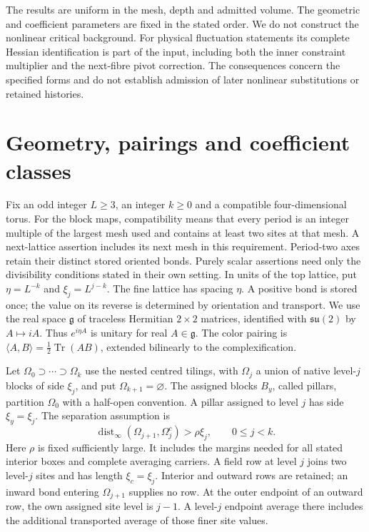 \documentclass[11pt,letterpaper,reqno]{amsart}
\numberwithin{equation}{section}
\theoremstyle{definition}
\theoremstyle{remark}
\begin{document}
The results are uniform in the mesh, depth and admitted volume.
The geometric and coefficient parameters are fixed in the stated
order. We do not construct the nonlinear critical background.
For physical fluctuation statements its complete Hessian
identification is part of the input, including both the inner
constraint multiplier and the next-fibre pivot correction.
The consequences concern the specified forms and do not establish
admission of later nonlinear substitutions or retained histories.


\section{Geometry, pairings and coefficient classes}\label{mb:geometry}

Fix an odd integer $L\ge3$, an integer $k\ge0$ and a compatible
four-dimensional torus. For the block maps, compatibility
means that every period is an integer multiple of the largest
mesh used and contains at least two sites at that mesh.
A next-lattice assertion includes its next mesh in this
requirement. Period-two axes retain their distinct stored
oriented bonds. Purely scalar assertions need only the
divisibility conditions stated in their own setting.
In units of the top lattice, put
$\eta=L^{-k}$ and $\xi_j=L^{j-k}$. The fine lattice has spacing
$\eta$. A positive bond is stored once; the value on its reverse
is determined by orientation and transport. We use the real
space $\mathfrak g$ of traceless Hermitian $2\times2$ matrices,
identified with $\mathfrak{su}(2)$ by $A\mapsto iA$.
Thus $e^{i\eta A}$ is unitary for real $A\in\mathfrak g$.
The color pairing is $\langle A,B\rangle=\tfrac12\operatorname{Tr}(AB)$,
extended bilinearly to the complexification.

Let $\Omega_0\supset\cdots\supset\Omega_k$ use the nested centred
tilings, with $\Omega_j$ a union of native level-$j$ blocks of
side $\xi_j$, and put $\Omega_{k+1}=\varnothing$. The assigned blocks
$B_y$, called pillars, partition $\Omega_0$ with a half-open
convention. A pillar assigned to level $j$ has side $\xi_y=\xi_j$.
The separation assumption is
\begin{equation}\label{mb:separation}
 \operatorname{dist}_\infty(\Omega_{j+1},\Omega_j^c)
                  >\rho\xi_j,\qquad 0\le j<k.
\end{equation}
Here $\rho$ is fixed sufficiently large. It includes the margins
needed for all stated interior boxes and complete averaging
carriers. A field row at level $j$ joins two level-$j$ sites and
has length $\xi_c=\xi_j$. Interior and outward rows are retained;
an inward bond entering $\Omega_{j+1}$ supplies no row. At the
outer endpoint of an outward row, the own assigned site level
is $j-1$. A level-$j$ endpoint average there includes the
additional transported average of those finer site values.
\end{document}
